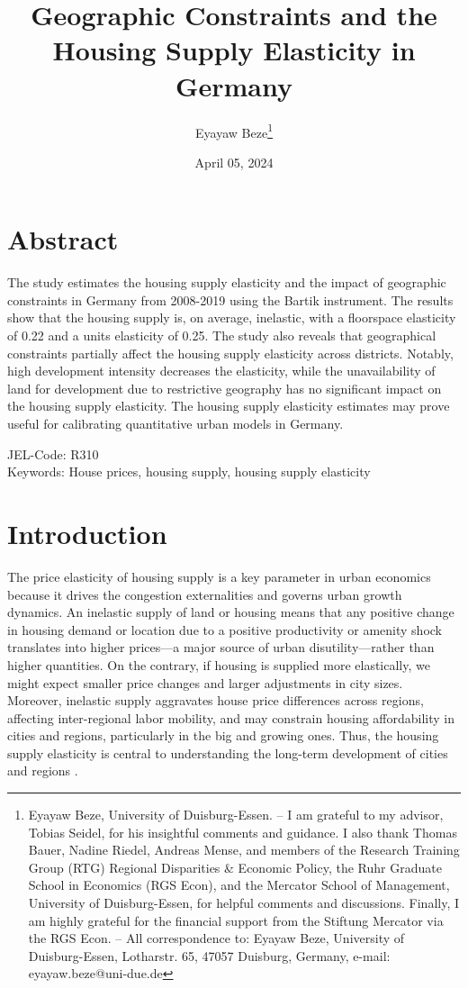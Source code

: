 \documentclass[
  12pt,
]{article}
\title{\textbf{Geographic Constraints and the Housing Supply Elasticity in Germany}}
\subtitle{\begin{center}
\href{https://uni-duisburg-essen.sciebo.de/s/km7tQzcygRQjwp6}{Click here for the latest version.}
\end{center}}
\author{Eyayaw Beze\footnote{Eyayaw Beze, University of Duisburg-Essen. -- I am grateful to my advisor, Tobias Seidel, for his insightful comments and guidance. I also thank Thomas Bauer, Nadine Riedel, Andreas Mense, and members of the Research Training Group (RTG) Regional Disparities \& Economic Policy, the Ruhr Graduate School in Economics (RGS Econ), and the Mercator School of Management, University of Duisburg-Essen, for helpful comments and discussions. Finally, I am highly grateful for the financial support from the Stiftung Mercator via the RGS Econ. -- All correspondence to: Eyayaw Beze, University of Duisburg-Essen, Lotharstr. 65, 47057 Duisburg, Germany, e-mail: eyayaw.beze@uni-due.de}}
\date{April 05, 2024}
\begin{document}
\maketitle





\section*{Abstract}\label{abstract}

The study estimates the housing supply elasticity and the impact of geographic constraints in Germany from 2008-2019 using the Bartik instrument. The results show that the housing supply is, on average, inelastic, with a floorspace elasticity of 0.22 and a units elasticity of 0.25. The study also reveals that geographical constraints partially affect the housing supply elasticity across districts. Notably, high development intensity decreases the elasticity, while the unavailability of land for development due to restrictive geography has no significant impact on the housing supply elasticity. The housing supply elasticity estimates may prove useful for calibrating quantitative urban models in Germany.

JEL-Code: R310\\
Keywords: House prices, housing supply, housing supply elasticity

\pagebreak

\section{Introduction}\label{introduction}


The price elasticity of housing supply is a key parameter in urban economics because it drives the congestion externalities and governs urban growth dynamics. An inelastic supply of land or housing means that any positive change in housing demand or location due to a positive productivity or amenity shock translates into higher prices---a major source of urban disutility---rather than higher quantities. On the contrary, if housing is supplied more elastically, we might expect smaller price changes and larger adjustments in city sizes. Moreover, inelastic supply aggravates house price differences across regions, affecting inter-regional labor mobility, and may constrain housing affordability in cities and regions, particularly in the big and growing ones. Thus, the housing supply elasticity is central to understanding the long-term development of cities and regions \citep{combes-etal2019, glaeser-etal2006, saks2008, lerbs2014}.
\end{document}
